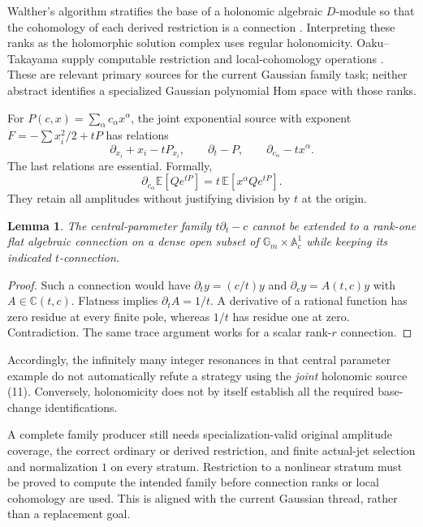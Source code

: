 \documentclass[11pt]{article}
\newtheorem{lemma}[proposition]{Lemma}
\newcommand{\C}{\mathbb C}
\newcommand{\A}{\mathbb A}
\begin{document}
Walther's algorithm stratifies the base of a holonomic algebraic
$D$-module so that the cohomology of each derived restriction is a
connection \cite{walther}. Interpreting these ranks as the holomorphic
solution complex uses regular holonomicity. Oaku--Takayama supply
computable restriction and local-cohomology operations
\cite{oaku}. These are relevant primary sources for the current Gaussian
family task; neither abstract identifies a specialized Gaussian polynomial
Hom space with those ranks.

For $P(c,x)=\sum_\alpha c_\alpha x^\alpha$, the joint exponential source
with exponent $F=-\sum x_i^2/2+tP$ has relations
\[
 \partial_{x_i}+x_i-tP_{x_i},\qquad
 \partial_t-P,\qquad
 \partial_{c_\alpha}-t x^\alpha.                              \tag{11}
\]
The last relations are essential. Formally,
\[
 \partial_{c_\alpha}\mathbb E[Qe^{tP}]
       =t\,\mathbb E[x^\alpha Qe^{tP}].
\]
They retain all amplitudes without justifying division by $t$ at the
origin.

\begin{lemma}
The central-parameter family $t\partial_t-c$ cannot be extended to a
rank-one flat algebraic connection on a dense open subset of
$\mathbb G_m\times\A^1_c$ while keeping its indicated $t$-connection.
\end{lemma}
\begin{proof}
Such a connection would have $\partial_t y=(c/t)y$ and
$\partial_c y=A(t,c)y$ with $A\in\C(t,c)$. Flatness implies
$\partial_t A=1/t$. A derivative of a rational function has zero residue
at every finite pole, whereas $1/t$ has residue one at zero. Contradiction.
The same trace argument works for a scalar rank-$r$ connection.
\end{proof}

Accordingly, the infinitely many integer resonances in that central
parameter example do not automatically refute a strategy using the
\emph{joint} holonomic source (11). Conversely, holonomicity does not by
itself establish all the required base-change identifications.

A complete family producer still needs specialization-valid original
amplitude coverage, the correct ordinary or derived restriction, and
finite actual-jet selection and normalization $1$ on every stratum.
Restriction to a nonlinear stratum must be proved to compute the intended
family before connection ranks or local cohomology are used. This is
aligned with the current Gaussian thread, rather than a replacement goal.
\end{document}
